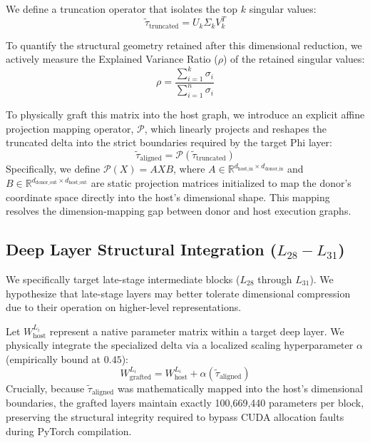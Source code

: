 \documentclass[11pt]{article}
\begin{document}
We define a truncation operator that isolates the top $k$ singular values:
$$ \tilde{\tau}_{\text{truncated}} = U_k \Sigma_k V_k^T $$

To quantify the structural geometry retained after this dimensional reduction, we actively measure the Explained Variance Ratio ($\rho$) of the retained singular values:
$$ \rho = \frac{\sum_{i=1}^k \sigma_i}{\sum_{i=1}^n \sigma_i} $$

To physically graft this matrix into the host graph, we introduce an explicit affine projection mapping operator, $\mathcal{P}$, which linearly projects and reshapes the truncated delta into the strict boundaries required by the target Phi layer:
$$ \tilde{\tau}_{\text{aligned}} = \mathcal{P}(\tilde{\tau}_{\text{truncated}}) $$
Specifically, we define $\mathcal{P}(X) = A X B$, where $A \in \mathbb{R}^{d_{\text{host\_in}} \times d_{\text{donor\_in}}}$ and $B \in \mathbb{R}^{d_{\text{donor\_out}} \times d_{\text{host\_out}}}$ are static projection matrices initialized to map the donor's coordinate space directly into the host's dimensional shape. This mapping resolves the dimension-mapping gap between donor and host execution graphs.

\subsection{Deep Layer Structural Integration ($L_{28} - L_{31}$)}
We specifically target late-stage intermediate blocks ($L_{28}$ through $L_{31}$). We hypothesize that late-stage layers may better tolerate dimensional compression due to their operation on higher-level representations.

Let $W_{\text{host}}^{L_i}$ represent a native parameter matrix within a target deep layer. We physically integrate the specialized delta via a localized scaling hyperparameter $\alpha$ (empirically bound at $0.45$):
$$ W_{\text{grafted}}^{L_i} = W_{\text{host}}^{L_i} + \alpha (\tilde{\tau}_{\text{aligned}}) $$
Crucially, because $\tilde{\tau}_{\text{aligned}}$ was mathematically mapped into the host's dimensional boundaries, the grafted layers maintain exactly 100,669,440 parameters per block, preserving the structural integrity required to bypass CUDA allocation faults during PyTorch compilation.
\end{document}
